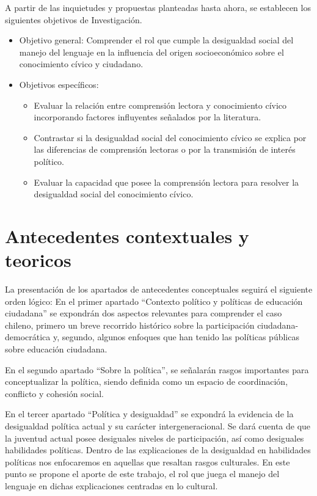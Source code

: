 \documentclass[12pt,twoside]{templates/facsothesis}
\begin{document}
A partir de las inquietudes y propuestas planteadas hasta ahora, se establecen los siguientes objetivos de Investigación.

\begin{itemize}
\item
  Objetivo general: Comprender el rol que cumple la desigualdad social del manejo del lenguaje en la influencia del origen socioeconómico sobre el conocimiento cívico y ciudadano.
\item
  Objetivos específicos:

  \begin{itemize}
  \item
    Evaluar la relación entre comprensión lectora y conocimiento cívico incorporando factores influyentes señalados por la literatura.
  \item
    Contrastar si la desigualdad social del conocimiento cívico se explica por las diferencias de comprensión lectoras o por la transmisión de interés político.
  \item
    Evaluar la capacidad que posee la comprensión lectora para resolver la desigualdad social del conocimiento cívico.
  \end{itemize}
\end{itemize}

\hypertarget{antecedentes-contextuales-y-teoricos}{%
\chapter{Antecedentes contextuales y teoricos}\label{antecedentes-contextuales-y-teoricos}}

La presentación de los apartados de antecedentes conceptuales seguirá el siguiente orden lógico: En el primer apartado ``Contexto político y políticas de educación ciudadana'' se expondrán dos aspectos relevantes para comprender el caso chileno, primero un breve recorrido histórico sobre la participación ciudadana-democrática y, segundo, algunos enfoques que han tenido las políticas públicas sobre educación ciudadana.

En el segundo apartado ``Sobre la política'', se señalarán rasgos importantes para conceptualizar la política, siendo definida como un espacio de coordinación, conflicto y cohesión social.

En el tercer apartado ``Política y desigualdad'' se expondrá la evidencia de la desigualdad política actual y su carácter intergeneracional. Se dará cuenta de que la juventud actual posee desiguales niveles de participación, así como desiguales habilidades políticas. Dentro de las explicaciones de la desigualdad en habilidades políticas nos enfocaremos en aquellas que resaltan rasgos culturales. En este punto se propone el aporte de este trabajo, el rol que juega el manejo del lenguaje en dichas explicaciones centradas en lo cultural.
\end{document}
